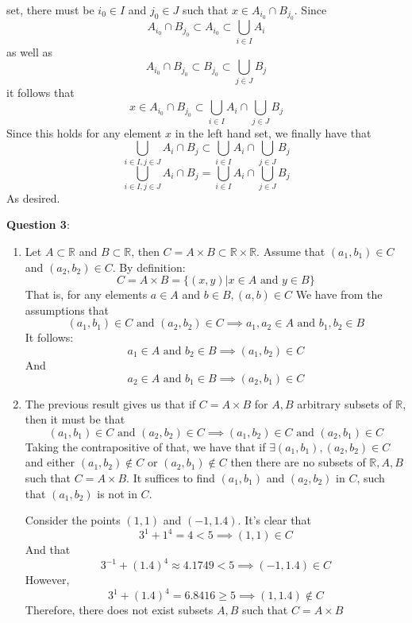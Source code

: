 \documentclass{article} %
\newcommand{\question}[2][]{
  \begin{flushleft}
    \textbf{Question #1}: \textit{#2}

\end{flushleft}}
\begin{document}
\begin{enumerate}
    set, there must be $i_0 \in I$ and $j_0 \in J$ such that $x \in
    A_{i_0} \cap B_{j_0}$. Since $$A_{i_0} \cap B_{j_0} \subset
    A_{i_0} \subset \bigcup_{i\in I} A_i$$ as well as $$A_{i_0} \cap B_{j_0}
    \subset B_{j_0} \subset \bigcup_{j \in J} B_j$$ it follows that
    \[
      x \in A_{i_0} \cap B_{j_0}  \subset \bigcup_{i \in I} A_i \cap
      \bigcup_{j \in J} B_j
    \]
    Since this holds for any element $x$ in the left hand set, we
    finally have that
    \[
      \bigcup_{i \in I,  j \in J} A_i \cap B_j \subset \bigcup_{i \in
      I} A_i \cap \bigcup_{j \in J} B_j
    \]
    \[
      \bigcup_{i \in I,  j \in J} A_i \cap B_j = \bigcup_{i \in
      I} A_i \cap \bigcup_{j \in J} B_j
    \]
    As desired.
\end{enumerate}

\question[3]{}
\begin{enumerate}
  \item Let $A \subset \mathbb{R}$ and $B \subset \mathbb{R}$, then
    $C = A \times B \subset \mathbb{R} \times \mathbb{R}$. Assume that $(a_1,
    b_1) \in C$ and $(a_2, b_2) \in C$. By definition:
    \[
      C = A\times B = \{(x,y)| x \in A \text{ and } y \in B\}
    \]
    That is, for any elements $a \in A$ and $b \in B, (a,b) \in C$
    We have from the assumptions that
    \[
      (a_1, b_1) \in C \text{ and } (a_2, b_2 ) \in C \implies a_1, a_2 \in
      A \text{ and } b_1, b_2 \in B
    \]
    It follows:
    \[
      a_1 \in A \text{ and } b_2 \in B \implies (a_1, b_2) \in C
    \]
    And
    \[
      a_2 \in A \text{ and } b_1 \in B \implies (a_2, b_1) \in C
    \]
  \item  The previous result gives us that if $C = A \times B$ for
    $A,B$ arbitrary subsets of $\mathbb{R}$, then it must be that
    $$(a_1, b_1) \in C \text{ and } (a_2, b_2) \in C \implies (a_1, b_2) \in C
    \text{ and } (a_2, b_1) \in C$$
    Taking the contrapositive of that, we have that
    if $\exists (a_1,
    b_1), (a_2, b_2) \in C$ and either $(a_1, b_2) \notin C$ or
    $(a_2, b_1) \notin C$ then there are no subsets of $\mathbb{R},
    A, B$ such that $C = A \times B$. It suffices to find $(a_1,
    b_1)$ and $(a_2, b_2)$ in $C$, such that $(a_1, b_2)$ is not in $C$.

    Consider the points $(1, 1)$ and $(-1, 1.4)$. It's clear that
    $$
    3^1 + 1^4 = 4 < 5 \implies (1,1) \in C
    $$
    And that
    $$
    3^{-1} + (1.4)^4 \approx 4.1749 < 5 \implies (-1, 1.4) \in C
    $$
    However,
    \[
      3^1 + (1.4)^4 = 6.8416 \ge 5 \implies (1, 1.4) \notin C
    \]
    Therefore, there does not exist subsets $A, B$ such that $C = A \times B$

\end{enumerate}
\end{document}
